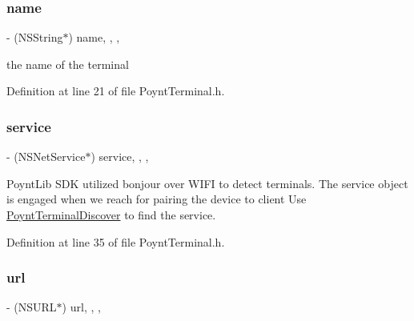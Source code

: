 \hypertarget{interface_poynt_terminal_a4b93d352d2fca75b34e1b5a50e03f587}{}\label{interface_poynt_terminal_a4b93d352d2fca75b34e1b5a50e03f587} 
\subsubsection{\texorpdfstring{name}{name}}
{\footnotesize\ttfamily -\/ (N\+S\+String$\ast$) name\hspace{0.3cm}{\ttfamily [read]}, {\ttfamily [write]}, {\ttfamily [nonatomic]}, {\ttfamily [strong]}}



the name of the terminal 



Definition at line 21 of file Poynt\+Terminal.\+h.

\hypertarget{interface_poynt_terminal_a4c12c4a257de1f39c44a0a72b272246a}{}\label{interface_poynt_terminal_a4c12c4a257de1f39c44a0a72b272246a} 
\subsubsection{\texorpdfstring{service}{service}}
{\footnotesize\ttfamily -\/ (N\+S\+Net\+Service$\ast$) service\hspace{0.3cm}{\ttfamily [read]}, {\ttfamily [write]}, {\ttfamily [nonatomic]}, {\ttfamily [strong]}}



Poynt\+Lib S\+DK utilized bonjour over W\+I\+FI to detect terminals. The service object is engaged when we reach for pairing the device to client  Use \hyperlink{interface_poynt_terminal_discover}{Poynt\+Terminal\+Discover} to find the service. 



Definition at line 35 of file Poynt\+Terminal.\+h.

\hypertarget{interface_poynt_terminal_a8d02094b967129e59efcc8c670677184}{}\label{interface_poynt_terminal_a8d02094b967129e59efcc8c670677184} 
\subsubsection{\texorpdfstring{url}{url}}
{\footnotesize\ttfamily -\/ (N\+S\+U\+RL$\ast$) url\hspace{0.3cm}{\ttfamily [read]}, {\ttfamily [write]}, {\ttfamily [nonatomic]}, {\ttfamily [strong]}}



